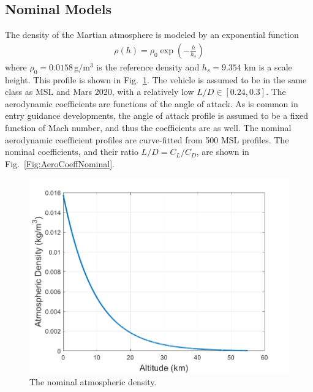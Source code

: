 \subsection{Nominal Models}
The density of the Martian atmosphere is modeled by an exponential function
\begin{align}
	\rho(h) = \rho_0\exp(-\frac{h}{h_s}) \label{Eq:Density}
\end{align}
where $\rho_0=0.0158\,\mathrm{g}/\mathrm{m}^3$ is the reference density and $h_s=9.354$ km is a scale height. This profile is shown in Fig.~\ref{Fig:DensityNominal}. The vehicle is assumed to be in the same class as MSL and Mars 2020, with a relatively low $L/D\in[0.24, 0.3]$. The aerodynamic coefficients are functions of the angle of attack. As is common in entry guidance developments, the angle of attack profile is assumed to be a fixed function of Mach number, and thus the coefficients are as well. The nominal aerodynamic coefficient profiles are curve-fitted from 500 MSL profiles. The nominal coefficients, and their ratio $L/D = C_L/C_D$, are shown in Fig.~\ref{Fig:AeroCoeffNominal}.
\begin{figure}[h!]
	\centering
	\includegraphics[width=1\textwidth]{Images/DensityNominal}
	\caption{The nominal atmospheric density.}
	\label{Fig:DensityNominal}
\end{figure}
